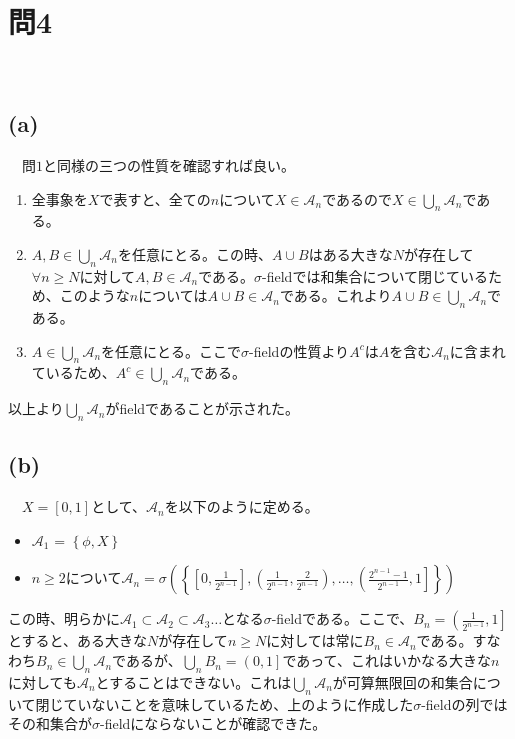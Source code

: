 \documentclass{article}
\begin{document}
\section{問4}
　\subsection{(a)}
　問$1$と同様の三つの性質を確認すれば良い。
\begin{enumerate}
	\item 全事象を$X$で表すと、全ての$n$について$X \in \mathcal{A}_n$であるので$X \in \bigcup_n \mathcal{A}_n$である。
	\item $A, B \in \bigcup_n \mathcal{A}_n$を任意にとる。この時、$A\cup B$はある大きな$N$が存在して$\forall n \geq N$に対して$A, B \in \mathcal{A}_n$である。$\sigma$-fieldでは和集合について閉じているため、このような$n$については$A\cup B \in \mathcal{A}_n$である。これより$A\cup B \in \bigcup_n \mathcal{A}_n$である。
	\item $A \in \bigcup_n \mathcal{A}_n$を任意にとる。ここで$\sigma$-fieldの性質より$A^c$は$A$を含む$\mathcal{A}_n$に含まれているため、$A^c \in \bigcup_n \mathcal{A}_n$である。
\end{enumerate}
以上より$\bigcup_n \mathcal{A}_n$がfieldであることが示された。

\subsection{(b)}
　$X = [0,1]$として、$\mathcal{A}_n$を以下のように定める。
\begin{itemize}
	\item $\mathcal{A}_1$ = $\left\{ \phi, X \right\}$
	\item $n \geq2$について$\mathcal{A}_n = \sigma\left(\left\{ \left[0, \frac{1}{2^{n-1}}\right], \left(\frac{1}{2^{n-1}}, \frac{2}{2^{n-1}}\right), \dots, \left(\frac{2^{n-1}-1}{2^{n-1}}, 1\right] \right\}\right)$
\end{itemize}
この時、明らかに$\mathcal{A}_1 \subset \mathcal{A}_2 \subset \mathcal{A}_3 \dots$となる$\sigma$-fieldである。ここで、$B_n = \left( \frac{1}{2^{n-1}}, 1\right]$とすると、ある大きな$N$が存在して$n \geq N$に対しては常に$B_n \in \mathcal{A}_n$である。すなわち$B_n \in \bigcup_n \mathcal{A}_n$であるが、$\bigcup_n B_n = \left(0, 1\right]$であって、これはいかなる大きな$n$に対しても$\mathcal{A}_n$とすることはできない。これは$\bigcup_n \mathcal{A}_n$が可算無限回の和集合について閉じていないことを意味しているため、上のように作成した$\sigma$-fieldの列ではその和集合が$\sigma$-fieldにならないことが確認できた。 
\end{document}
